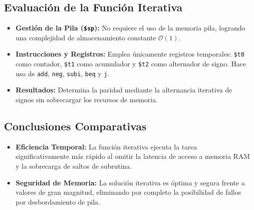 \documentclass[12pt,a4paper]{article}
\begin{document}
\subsection{Evaluación de la Función Iterativa}
\begin{itemize}
    \item \textbf{Gestión de la Pila (\texttt{\$sp}):} No requiere el uso de la memoria pila, logrando una complejidad de almacenamiento constante $\mathcal{O}(1)$.
    \item \textbf{Instrucciones y Registros:} Emplea únicamente registros temporales: \texttt{\$t0} como contador, \texttt{\$t1} como acumulador y \texttt{\$t2} como alternador de signo. Hace uso de \texttt{add}, \texttt{neg}, \texttt{subi}, \texttt{beq} y \texttt{j}.
    \item \textbf{Resultados:} Determina la paridad mediante la alternancia iterativa de signos sin sobrecargar los recursos de memoria.
\end{itemize}

\subsection{Conclusiones Comparativas}
\begin{itemize}
    \item \textbf{Eficiencia Temporal:} La función iterativa ejecuta la tarea significativamente más rápido al omitir la latencia de acceso a memoria RAM y la sobrecarga de saltos de subrutina.
    \item \textbf{Seguridad de Memoria:} La solución iterativa es óptima y segura frente a valores de gran magnitud, eliminando por completo la posibilidad de fallos por desbordamiento de pila.
\end{itemize}
\end{document}
